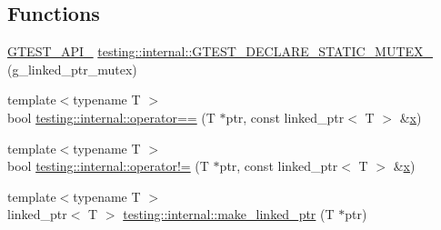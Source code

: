 \subsection*{Functions}
\begin{DoxyCompactItemize}
\item 
\mbox{\hyperlink{_obj__test_2lib_2googletest-release-1_88_81_2googletest_2include_2gtest_2internal_2gtest-port_8h_aa73be6f0ba4a7456180a94904ce17790}{G\+T\+E\+S\+T\+\_\+\+A\+P\+I\+\_\+}} \mbox{\hyperlink{namespacetesting_1_1internal_ad7c5625384cf5f6b714188f274537ef6}{testing\+::internal\+::\+G\+T\+E\+S\+T\+\_\+\+D\+E\+C\+L\+A\+R\+E\+\_\+\+S\+T\+A\+T\+I\+C\+\_\+\+M\+U\+T\+E\+X\+\_\+}} (g\+\_\+linked\+\_\+ptr\+\_\+mutex)
\item 
{\footnotesize template$<$typename T $>$ }\\bool \mbox{\hyperlink{namespacetesting_1_1internal_ad1cb54a206a209ddace17a05359d38ae}{testing\+::internal\+::operator==}} (T $\ast$ptr, const linked\+\_\+ptr$<$ T $>$ \&\mbox{\hyperlink{_obj__test_2lib_2googletest-master_2googlemock_2test_2gmock-matchers__test_8cc_a6150e0515f7202e2fb518f7206ed97dc}{x}})
\item 
{\footnotesize template$<$typename T $>$ }\\bool \mbox{\hyperlink{namespacetesting_1_1internal_a6910869259f8f31825b471e9190fa09a}{testing\+::internal\+::operator!=}} (T $\ast$ptr, const linked\+\_\+ptr$<$ T $>$ \&\mbox{\hyperlink{_obj__test_2lib_2googletest-master_2googlemock_2test_2gmock-matchers__test_8cc_a6150e0515f7202e2fb518f7206ed97dc}{x}})
\item 
{\footnotesize template$<$typename T $>$ }\\linked\+\_\+ptr$<$ T $>$ \mbox{\hyperlink{namespacetesting_1_1internal_a0d79fad1f772844eff35dfe955f24fd6}{testing\+::internal\+::make\+\_\+linked\+\_\+ptr}} (T $\ast$ptr)
\end{DoxyCompactItemize}
